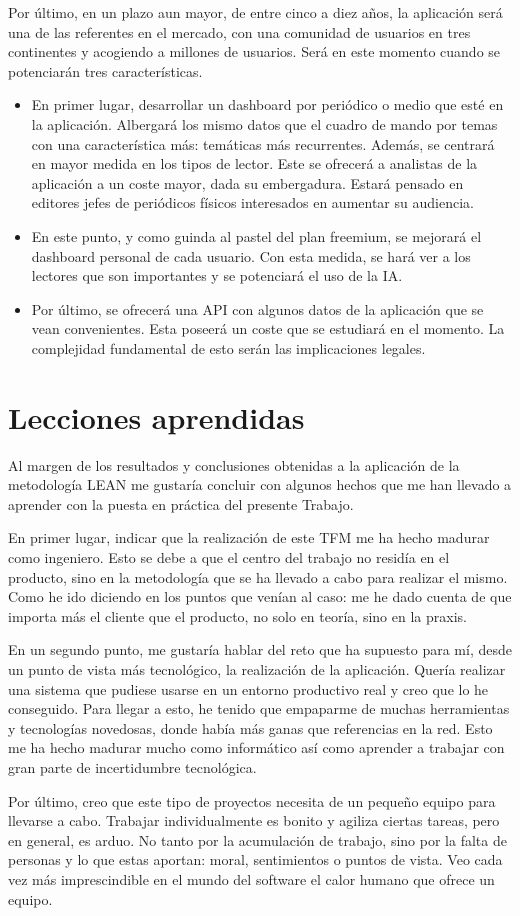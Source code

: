 Por último, en un plazo aun mayor, de entre cinco a diez años, la aplicación será una de las referentes en el mercado, con una comunidad de usuarios en tres continentes y acogiendo a millones de usuarios. Será en este momento cuando se potenciarán tres características.

\begin{itemize}
    \item En primer lugar, desarrollar un dashboard por periódico o medio que esté en la aplicación. Albergará los mismo datos que el cuadro de mando por temas con una característica más: temáticas más recurrentes. Además, se centrará en mayor medida en los tipos de lector. Este se ofrecerá a analistas de la aplicación a un coste mayor, dada su embergadura. Estará pensado en editores jefes de periódicos físicos interesados en aumentar su audiencia.
    \item En este punto, y como guinda al pastel del plan freemium, se mejorará el dashboard personal de cada usuario. Con esta medida, se hará ver a los lectores que son importantes y se potenciará el uso de la IA.
    \item Por último, se ofrecerá una API con algunos datos de la aplicación que se vean convenientes. Esta poseerá un coste que se estudiará en el momento. La complejidad fundamental de esto serán las implicaciones legales.
\end{itemize}

\section{Lecciones aprendidas}\label{sec:lecciones_aprendidas}

Al margen de los resultados y conclusiones obtenidas a la aplicación de la metodología LEAN me gustaría concluir con algunos hechos que me han llevado a aprender con la puesta en práctica del presente Trabajo.

En primer lugar, indicar que la realización de este TFM me ha hecho madurar como ingeniero. Esto se debe a que el centro del trabajo no residía en el producto, sino en la metodología que se ha llevado a cabo para realizar el mismo. Como he ido diciendo en los puntos que venían al caso: me he dado cuenta de que importa más el cliente que el producto, no solo en teoría, sino en la praxis.

En un segundo punto, me gustaría hablar del reto que ha supuesto para mí, desde un punto de vista más tecnológico, la realización de la aplicación. Quería realizar una sistema que pudiese usarse en un entorno productivo real y creo que lo he conseguido. Para llegar a esto, he tenido que empaparme de muchas herramientas y tecnologías novedosas, donde había más ganas que referencias en la red. Esto me ha hecho madurar mucho como informático así como aprender a trabajar con gran parte de incertidumbre tecnológica.

Por último, creo que este tipo de proyectos necesita de un pequeño equipo para llevarse a cabo. Trabajar individualmente es bonito y agiliza ciertas tareas, pero en general, es arduo. No tanto por la acumulación de trabajo, sino por la falta de personas y lo que estas aportan: moral, sentimientos o puntos de vista. Veo cada vez más imprescindible en el mundo del software el calor humano que ofrece un equipo.